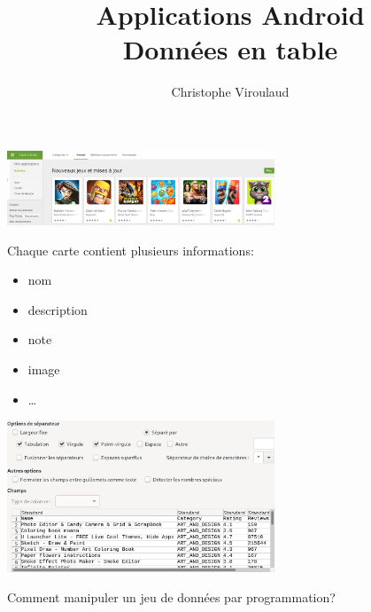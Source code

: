\documentclass[svgnames,11pt]{beamer}
\author[]{Christophe Viroulaud}
\title{Applications Android\\
Données en table}
\date{\framebox{\textbf{Tab 01}}}
\institute{Première - NSI}
\begin{document}
\begin{frame}
    \titlepage
\end{frame}

\begin{frame}
    \begin{center}
        \centering
        \includegraphics[width=8cm]{ressources/playstore.png}
        \label{IMG}
    \end{center}
\begin{center}
    Chaque carte contient plusieurs informations:
    \begin{itemize}
        \item nom
        \item description
        \item note
        \item image
        \item \dots
    \end{itemize}
\end{center}
\end{frame}

\begin{frame}
    \begin{center}
        \centering
        \includegraphics[width=8cm]{ressources/jeu-donnees.png}
        \label{IMG}
    \end{center}
    \begin{framed}
        \centering Comment manipuler un jeu de données par programmation?
    \end{framed}

\end{frame}
\end{document}
